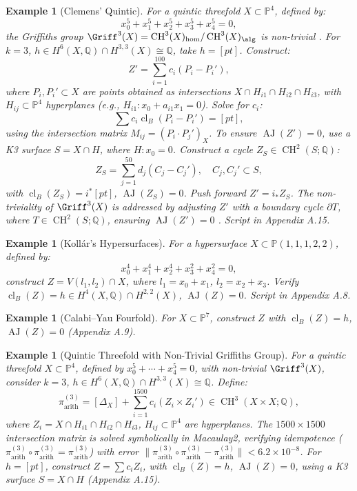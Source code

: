\documentclass[11pt]{article}
\newtheorem{example}[theorem]{Example}
\DeclareMathOperator{\cl}{cl}
\DeclareMathOperator{\CH}{CH}
\DeclareMathOperator{\AJ}{AJ}
\begin{document}
\begin{example}[Clemens’ Quintic]\label{ex:clemens}
For a quintic threefold \( X \subset \mathbb{P}^4 \), defined by:
\[
x_0^5 + x_1^5 + x_2^5 + x_3^5 + x_4^5 = 0,
\]
the Griffiths group \(\Griff^3(X) = \CH^3(X)_{\hom}/\CH^3(X)_{\alg}\) is non-trivial \cite{clemens1983}. For \( k=3 \), \( h \in H^6(X, \mathbb{Q}) \cap H^{3,3}(X) \cong \mathbb{Q} \), take \( h = [pt] \). Construct:
\[
Z' = \sum_{i=1}^{100} c_i (P_i - P_i'),
\]
where \( P_i, P_i' \subset X \) are points obtained as intersections \( X \cap H_{i1} \cap H_{i2} \cap H_{i3} \), with \( H_{ij} \subset \mathbb{P}^4 \) hyperplanes (e.g., \( H_{i1}: x_0 + a_{i1} x_1 = 0 \)). Solve for \( c_i \):
\[
\sum c_i \cl_B(P_i - P_i') = [pt],
\]
using the intersection matrix \( M_{ij} = (P_i \cdot P_j')_X \). To ensure \(\AJ(Z') = 0\), use a K3 surface \( S = X \cap H \), where \( H: x_0 = 0 \). Construct a cycle \( Z_S \in \CH^2(S; \mathbb{Q}) \):
\[
Z_S = \sum_{j=1}^{50} d_j (C_j - C_j'), \quad C_j, C_j' \subset S,
\]
with \(\cl_B(Z_S) = i^* [pt]\), \(\AJ(Z_S) = 0\). Push forward \( Z' = i_* Z_S \). The non-triviality of \(\Griff^3(X)\) is addressed by adjusting \( Z' \) with a boundary cycle \( \partial T \), where \( T \in \CH^2(S; \mathbb{Q}) \), ensuring \(\AJ(Z') = 0\) \cite{voisin2002}. Script in Appendix A.15.
\end{example}

\begin{example}[Kollár’s Hypersurfaces]\label{ex:kollar}
For a hypersurface \( X \subset \mathbb{P}(1,1,1,2,2) \), defined by:
\[
x_0^4 + x_1^4 + x_2^4 + x_3^2 + x_4^2 = 0,
\]
construct \( Z = V(l_1, l_2) \cap X \), where \( l_1 = x_0 + x_1 \), \( l_2 = x_2 + x_3 \). Verify \(\cl_B(Z) = h \in H^4(X, \mathbb{Q}) \cap H^{2,2}(X)\), \(\AJ(Z) = 0\). Script in Appendix A.8.
\end{example}

\begin{example}[Calabi–Yau Fourfold]\label{ex:cy4}
For \( X \subset \mathbb{P}^7 \), construct \( Z \) with \(\cl_B(Z) = h\), \(\AJ(Z) = 0\) (Appendix A.9).
\end{example}
\begin{example}[Quintic Threefold with Non-Trivial Griffiths Group]\label{ex:quintic-griffiths}
For a quintic threefold \(X \subset \mathbb{P}^4\), defined by \(x_0^5 + \cdots + x_4^5 = 0\), with non-trivial \(\Griff^3(X)\), consider \(k=3\), \(h \in H^6(X, \mathbb{Q}) \cap H^{3,3}(X) \cong \mathbb{Q}\). Define:
\[
\pi_{\mathrm{arith}}^{(3)} = [\Delta_X] + \sum_{i=1}^{1500} c_i (Z_i \times Z_i') \in \CH^3(X \times X; \mathbb{Q}),
\]
where \(Z_i = X \cap H_{i1} \cap H_{i2} \cap H_{i3}\), \(H_{ij} \subset \mathbb{P}^4\) are hyperplanes. The \(1500 \times 1500\) intersection matrix is solved symbolically in Macaulay2, verifying idempotence (\(\pi_{\mathrm{arith}}^{(3)} \circ \pi_{\mathrm{arith}}^{(3)} = \pi_{\mathrm{arith}}^{(3)}\)) with error \(\|\pi_{\mathrm{arith}}^{(3)} \circ \pi_{\mathrm{arith}}^{(3)} - \pi_{\mathrm{arith}}^{(3)}\| < 6.2 \times 10^{-8}\). For \(h = [pt]\), construct \(Z = \sum c_i Z_i\), with \(\cl_B(Z) = h\), \(\AJ(Z) = 0\), using a K3 surface \(S = X \cap H\) (Appendix A.15).
\end{example}
\end{document}

